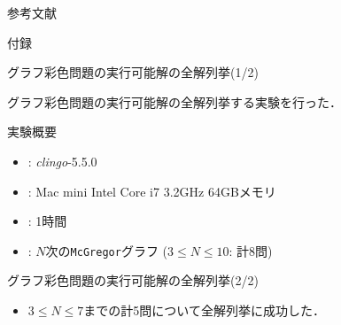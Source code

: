 \documentclass[dvipdfmx,11pt]{beamer}
\newcommand{\code}[1]{\lstinline[basicstyle=\ttfamily]{#1}}
\begin{document}

\begin{frame}[noframenumbering]{参考文献}
\end{frame}


\begin{frame}[noframenumbering]{}
 \thispagestyle{empty}
 \Huge 付録
\end{frame}

\begin{frame}[noframenumbering]{グラフ彩色問題の実行可能解の全解列挙(1/2)}
 \thispagestyle{empty}

 \begin{block}{}
  グラフ彩色問題の実行可能解の全解列挙する実験を行った．  
 \end{block}

 \begin{block}{実験概要}
  \begin{itemize}
   \item {}: \textit{clingo}-5.5.0
   \item {}: Mac mini Intel Core i7 3.2GHz 64GBメモリ
   \item {}: 1時間
   \item {}: $N$次の\code{McGregor}グラフ ($3 \leq N\leq 10$: 計8問)
  \end{itemize}
 \end{block}
\end{frame}

\begin{frame}[noframenumbering]{グラフ彩色問題の実行可能解の全解列挙(2/2)}
 \thispagestyle{empty}

 \begin{center}
  
 \end{center}

 \begin{itemize}
  \item $3 \leq N\leq 7$までの計5問について全解列挙に成功した．
 \end{itemize}
\end{frame}

\end{document}
